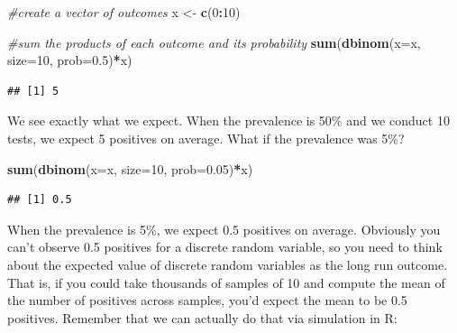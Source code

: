 \documentclass[
]{book}
\newenvironment{Shaded}{\begin{snugshade}}{\end{snugshade}}
\newcommand{\AttributeTok}[1]{\textcolor[rgb]{0.13,0.29,0.53}{#1}}
\newcommand{\CommentTok}[1]{\textcolor[rgb]{0.56,0.35,0.01}{\textit{#1}}}
\newcommand{\DecValTok}[1]{\textcolor[rgb]{0.00,0.00,0.81}{#1}}
\newcommand{\FloatTok}[1]{\textcolor[rgb]{0.00,0.00,0.81}{#1}}
\newcommand{\FunctionTok}[1]{\textcolor[rgb]{0.13,0.29,0.53}{\textbf{#1}}}
\newcommand{\NormalTok}[1]{#1}
\newcommand{\OtherTok}[1]{\textcolor[rgb]{0.56,0.35,0.01}{#1}}
\newcommand{\SpecialCharTok}[1]{\textcolor[rgb]{0.81,0.36,0.00}{\textbf{#1}}}
\begin{document}
\begin{Shaded}
\begin{Highlighting}[]
\CommentTok{\#create a vector of outcomes}
\NormalTok{x }\OtherTok{\textless{}{-}} \FunctionTok{c}\NormalTok{(}\DecValTok{0}\SpecialCharTok{:}\DecValTok{10}\NormalTok{)}

\CommentTok{\#sum the products of each outcome and its probability}
\FunctionTok{sum}\NormalTok{(}\FunctionTok{dbinom}\NormalTok{(}\AttributeTok{x=}\NormalTok{x, }\AttributeTok{size=}\DecValTok{10}\NormalTok{, }\AttributeTok{prob=}\FloatTok{0.5}\NormalTok{)}\SpecialCharTok{*}\NormalTok{x)}
\end{Highlighting}
\end{Shaded}

\begin{verbatim}
## [1] 5
\end{verbatim}

We see exactly what we expect. When the prevalence is 50\% and we conduct 10 tests, we expect 5 positives on average. What if the prevalence was 5\%?

\begin{Shaded}
\begin{Highlighting}[]
\FunctionTok{sum}\NormalTok{(}\FunctionTok{dbinom}\NormalTok{(}\AttributeTok{x=}\NormalTok{x, }\AttributeTok{size=}\DecValTok{10}\NormalTok{, }\AttributeTok{prob=}\FloatTok{0.05}\NormalTok{)}\SpecialCharTok{*}\NormalTok{x)}
\end{Highlighting}
\end{Shaded}

\begin{verbatim}
## [1] 0.5
\end{verbatim}

When the prevalence is 5\%, we expect 0.5 positives on average. Obviously you can't observe 0.5 positives for a discrete random variable, so you need to think about the expected value of discrete random variables as the long run outcome. That is, if you could take thousands of samples of 10 and compute the mean of the number of positives across samples, you'd expect the mean to be 0.5 positives. Remember that we can actually do that via simulation in R:
\end{document}
